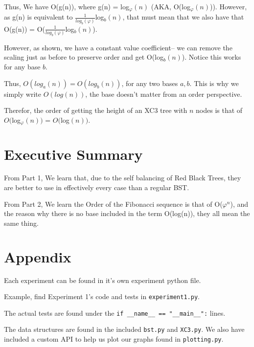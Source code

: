 \documentclass{article}
\begin{document}
Thus, We have O(g(n)), where g(n) = log$_{\varphi}(n)$ (AKA, O(log$_{\varphi}(n)$)). However, as g(n) is equivalent to $\frac{1}{log_{b}(\varphi)}$log$_{b}(n)$, that must mean that we also have that O(g(n)) = O($\frac{1}{log_{b}(\varphi)}$log$_{b}(n)$).

However, as shown, we have a constant value coefficient-- we can remove the scaling just as before to preserve order and get O(log$_{b}(n)$). Notice this works for any base $b$.

Thus, $O(log_{a}(n)) = O(log_{b}(n))$, for any two bases $a, b$. This is why we simply write $O(log(n))$, the base doesn't matter from an order perspective.

Therefor, the order of getting the height of an XC3 tree with $n$ nodes is that of $O($log$_{\varphi}(n))$ = $O($log$(n))$.


\section{Executive Summary}

From Part 1, We learn that, due to the self balancing of Red Black Trees, they are better to use in effectively every case than a regular BST.

From Part 2, We learn the Order of the Fibonacci sequence is that of O($\varphi^{n}$), and the reason why there is no base included in the term O(log(n)), they all mean the same thing. 


\newpage
\section{Appendix}

Each experiment can be found in it's own experiment python file. 

Example, find Experiment 1's code and tests in \verb|experiment1.py|.

The actual tests are found under the \verb|if __name__ == "__main__":| lines.

The data structures are found in the included \verb|bst.py| and \verb|XC3.py|. We also have included a custom API to help us plot our graphs found in \verb|plotting.py|.
\end{document}
